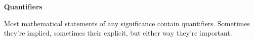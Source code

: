 \documentclass[12 pt]{article}
\theoremstyle{definition}
\theoremstyle{plain}
\theoremstyle{mytheorem}
\theoremstyle{myexample}
\theoremstyle{mydefinition}
\begin{document}
\begin{center}
\textbf{Quantifiers}
\end{center}

Most mathematical statements of any significance contain quantifiers.  Sometimes they're implied, sometimes their explicit, but either way they're important.

\begin{center}
\end{center}
\end{document}
